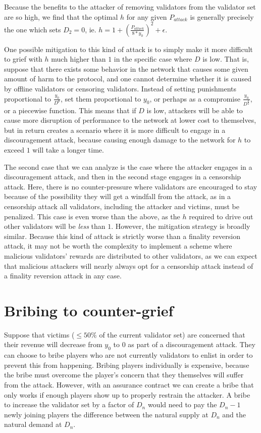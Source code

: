 \documentclass[12pt]{article}
\begin{document}
Because the benefits to the attacker of removing validators from the validator set are so high, we find that the optimal $h$ for any given $P_{attack}$ is generally precisely the one which sets $D_2 = 0$, ie. $h = 1 + (\frac{P_{attack}}{8 * y_0})^2 + \epsilon$.

One possible mitigation to this kind of attack is to simply make it more difficult to grief with $h$ much higher than $1$ in the specific case where $D$ is low. That is, suppose that there exists some behavior in the network that causes some given amount of harm to the protocol, and one cannot determine whether it is caused by offline validators or censoring validators. Instead of setting punishments proportional to $\frac{y_0}{D^p}$, set them proportional to $y_0$, or perhaps as a compromise $\frac{y_0}{D^\frac{p}{2}}$, or a piecewise function. This means that if $D$ is low, attackers will be able to cause more disruption of performance to the network at lower cost to themselves, but in return creates a scenario where it is more difficult to engage in a discouragement attack, because causing enough damage to the network for $h$ to exceed $1$ will take a longer time.

The second case that we can analyze is the case where the attacker engages in a discouragement attack, and then in the second stage engages in a censorship attack. Here, there is no counter-pressure where validators are encouraged to stay because of the possibility they will get a windfall from the attack, as in a censorship attack all validators, including the attacker and victims, must be penalized. This case is even worse than the above, as the $h$ required to drive out other validators will be \textit{less} than $1$. However, the mitigation strategy is broadly similar. Because this kind of attack is strictly worse than a finality reversion attack, it may not be worth the complexity to implement a scheme where malicious validators' rewards are distributed to other validators, as we can expect that malicious attackers will nearly always opt for a censorship attack instead of a finality reversion attack in any case.

\section{Bribing to counter-grief}

Suppose that victims ($\le 50\%$ of the current validator set) are concerned that their revenue will decrease from $y_0$ to 0 as part of a discouragement attack. They can choose to bribe players who are not currently validators to enlist in order to prevent this from happening. Bribing players individually is expensive, because the bribe must overcome the player's concern that they themselves will suffer from the attack. However, with an assurance contract we can create a bribe that only works if enough players show up to properly restrain the attacker. A bribe to increase the validator set by a factor of $D_n$ would need to pay the $D_n-1$ newly joining players the difference between the natural supply at $D_n$ and the natural demand at $D_n$.
\end{document}
